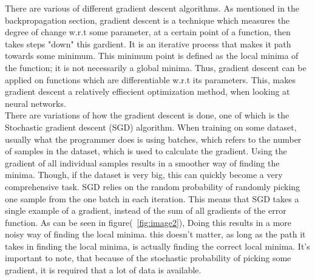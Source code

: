 There are various of different gradient descent algorithms. As mentioned in the backpropagation section, gradient descent is a technique which measures the degree of change w.r.t some parameter, at a certain point of a function, then takes steps "down" this gardient. It is an iterative process that makes it path towards some minimum. This minimum point is defined as the local minima of the function; it is not necessarily a global minima. Thus, gradient descent can be applied on functions which are differentiable w.r.t its parameters. This, makes gradient descent a relatively effiecient optimization method, when looking at neural networks.\\

\noindent
There are variations of how the gradient descent is done, one of which is the Stochastic gradient descent (SGD) algorithm. When training on some dataset, usually what the programmer does is using batches, which refers to the number of samples in the dataset, which is used to calculate the gradient. Using the gradient of all individual samples results in a smoother way of finding the minima. Though, if the dataset is very big, this can quickly become a very comprehensive task. SGD relies on the random probability of randomly picking one sample from the one batch in each iteration. This means that SGD takes a single example of a gradient, instead of the sum of all gradients of the error function. As can be seen in figure(~\ref{fig:image2}), Doing this results in a more noisy way of finding the local minima. this doesn't matter, as long as the path it takes in finding the local minima, is actually finding the correct local minima. It's important to note, that because of the stochastic probability of picking some gradient, it is required that a lot of data is available.




